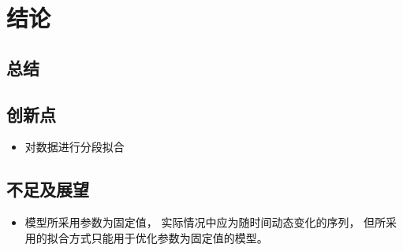 \section{结论}
\subsection{总结}
\subsection{创新点}
\begin{itemize}
    \item 对数据进行分段拟合
\end{itemize}
\subsection{不足及展望}
\begin{itemize}
    \item 模型所采用参数为固定值，
          实际情况中应为随时间动态变化的序列，
          但所采用的拟合方式只能用于优化参数为固定值的模型。
\end{itemize}